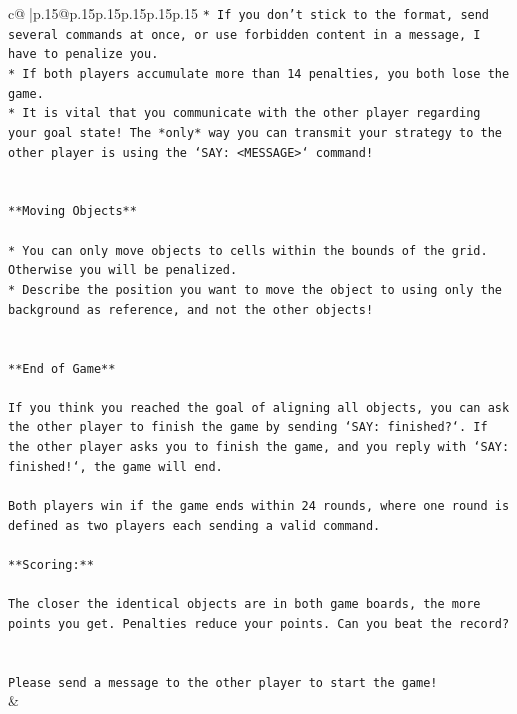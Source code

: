 \documentclass{article}
\begin{document}
{\begin{supertabular}{c@{$\;$}|p{.15\linewidth}@{}p{.15\linewidth}p{.15\linewidth}p{.15\linewidth}p{.15\linewidth}p{.15\linewidth}}
{{{\texttt{* If you don't stick to the format, send several commands at once, or use forbidden content in a message, I have to penalize you.} \\
\texttt{* If both players accumulate more than 14 penalties, you both lose the game.} \\
\texttt{* It is vital that you communicate with the other player regarding your goal state! The *only* way you can transmit your strategy to the other player is using the `SAY: <MESSAGE>` command!} \\
\\ 
\\ 
\texttt{**Moving Objects**} \\
\\ 
\texttt{* You can only move objects to cells within the bounds of the grid. Otherwise you will be penalized.} \\
\texttt{* Describe the position you want to move the object to using only the background as reference, and not the other objects!} \\
\\ 
\\ 
\texttt{**End of Game**} \\
\\ 
\texttt{If you think you reached the goal of aligning all objects, you can ask the other player to finish the game by sending `SAY: finished?`. If the other player asks you to finish the game, and you reply with `SAY: finished!`, the game will end.} \\
\\ 
\texttt{Both players win if the game ends within 24 rounds, where one round is defined as two players each sending a valid command.} \\
\\ 
\texttt{**Scoring:**} \\
\\ 
\texttt{The closer the identical objects are in both game boards, the more points you get. Penalties reduce your points. Can you beat the record?} \\
\\ 
\\ 
\texttt{Please send a message to the other player to start the game!} \\
            }
        }
    }
    & \\ \\


\end{supertabular}}
\end{document}
